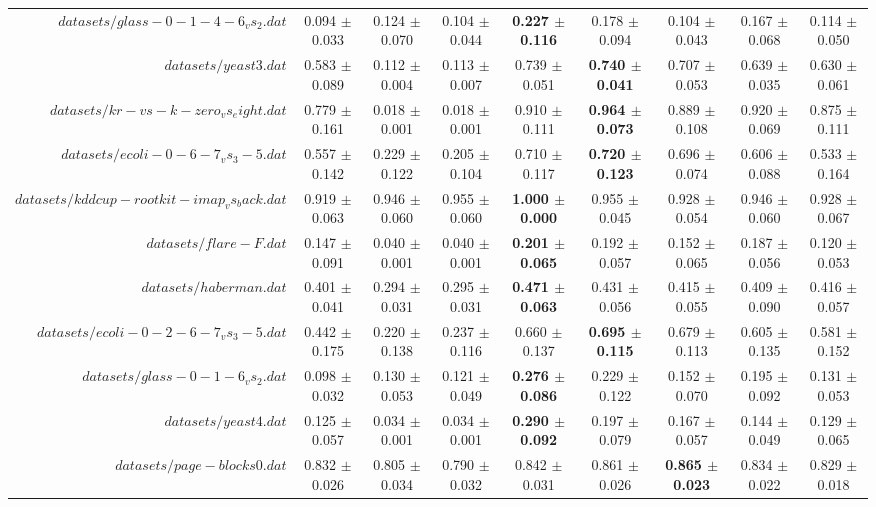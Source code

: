 \begin{table}[!ht]
{\begin{tabular}{r c c c c c c c c}
$datasets/glass-0-1-4-6_vs_2.dat$ & 0.094 $\pm$ 0.033 & 0.124 $\pm$ 0.070 & 0.104 $\pm$ 0.044 & \textbf{0.227 $\pm$ 0.116} & 0.178 $\pm$ 0.094 & 0.104 $\pm$ 0.043 & 0.167 $\pm$ 0.068 & 0.114 $\pm$ 0.050 \\
$datasets/yeast3.dat$ & 0.583 $\pm$ 0.089 & 0.112 $\pm$ 0.004 & 0.113 $\pm$ 0.007 & 0.739 $\pm$ 0.051 & \textbf{0.740 $\pm$ 0.041} & 0.707 $\pm$ 0.053 & 0.639 $\pm$ 0.035 & 0.630 $\pm$ 0.061 \\
$datasets/kr-vs-k-zero_vs_eight.dat$ & 0.779 $\pm$ 0.161 & 0.018 $\pm$ 0.001 & 0.018 $\pm$ 0.001 & 0.910 $\pm$ 0.111 & \textbf{0.964 $\pm$ 0.073} & 0.889 $\pm$ 0.108 & 0.920 $\pm$ 0.069 & 0.875 $\pm$ 0.111 \\
$datasets/ecoli-0-6-7_vs_3-5.dat$ & 0.557 $\pm$ 0.142 & 0.229 $\pm$ 0.122 & 0.205 $\pm$ 0.104 & 0.710 $\pm$ 0.117 & \textbf{0.720 $\pm$ 0.123} & 0.696 $\pm$ 0.074 & 0.606 $\pm$ 0.088 & 0.533 $\pm$ 0.164 \\
$datasets/kddcup-rootkit-imap_vs_back.dat$ & 0.919 $\pm$ 0.063 & 0.946 $\pm$ 0.060 & 0.955 $\pm$ 0.060 & \textbf{1.000 $\pm$ 0.000} & 0.955 $\pm$ 0.045 & 0.928 $\pm$ 0.054 & 0.946 $\pm$ 0.060 & 0.928 $\pm$ 0.067 \\
$datasets/flare-F.dat$ & 0.147 $\pm$ 0.091 & 0.040 $\pm$ 0.001 & 0.040 $\pm$ 0.001 & \textbf{0.201 $\pm$ 0.065} & 0.192 $\pm$ 0.057 & 0.152 $\pm$ 0.065 & 0.187 $\pm$ 0.056 & 0.120 $\pm$ 0.053 \\
$datasets/haberman.dat$ & 0.401 $\pm$ 0.041 & 0.294 $\pm$ 0.031 & 0.295 $\pm$ 0.031 & \textbf{0.471 $\pm$ 0.063} & 0.431 $\pm$ 0.056 & 0.415 $\pm$ 0.055 & 0.409 $\pm$ 0.090 & 0.416 $\pm$ 0.057 \\
$datasets/ecoli-0-2-6-7_vs_3-5.dat$ & 0.442 $\pm$ 0.175 & 0.220 $\pm$ 0.138 & 0.237 $\pm$ 0.116 & 0.660 $\pm$ 0.137 & \textbf{0.695 $\pm$ 0.115} & 0.679 $\pm$ 0.113 & 0.605 $\pm$ 0.135 & 0.581 $\pm$ 0.152 \\
$datasets/glass-0-1-6_vs_2.dat$ & 0.098 $\pm$ 0.032 & 0.130 $\pm$ 0.053 & 0.121 $\pm$ 0.049 & \textbf{0.276 $\pm$ 0.086} & 0.229 $\pm$ 0.122 & 0.152 $\pm$ 0.070 & 0.195 $\pm$ 0.092 & 0.131 $\pm$ 0.053 \\
$datasets/yeast4.dat$ & 0.125 $\pm$ 0.057 & 0.034 $\pm$ 0.001 & 0.034 $\pm$ 0.001 & \textbf{0.290 $\pm$ 0.092} & 0.197 $\pm$ 0.079 & 0.167 $\pm$ 0.057 & 0.144 $\pm$ 0.049 & 0.129 $\pm$ 0.065 \\
$datasets/page-blocks0.dat$ & 0.832 $\pm$ 0.026 & 0.805 $\pm$ 0.034 & 0.790 $\pm$ 0.032 & 0.842 $\pm$ 0.031 & 0.861 $\pm$ 0.026 & \textbf{0.865 $\pm$ 0.023} & 0.834 $\pm$ 0.022 & 0.829 $\pm$ 0.018 \\

\end{tabular}}
\end{table}
